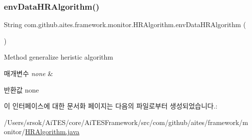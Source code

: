 \subsubsection{\texorpdfstring{env\+Data\+H\+R\+Algorithm()}{envDataHRAlgorithm()}}
{\footnotesize\ttfamily String com.\+github.\+aites.\+framework.\+monitor.\+H\+R\+Algorithm.\+env\+Data\+H\+R\+Algorithm (\begin{DoxyParamCaption}{ }\end{DoxyParamCaption})}



Method generalize heristic algorithm 


\begin{DoxyParams}{매개변수}
{\em none} & \\
\hline
\end{DoxyParams}
\begin{DoxyReturn}{반환값}
none 
\end{DoxyReturn}


이 인터페이스에 대한 문서화 페이지는 다음의 파일로부터 생성되었습니다.\+:\begin{DoxyCompactItemize}
\item 
/\+Users/srsok/\+Ai\+T\+E\+S/core/\+Ai\+T\+E\+S\+Framework/src/com/github/aites/framework/monitor/\mbox{\hyperlink{_h_r_algorithm_8java}{H\+R\+Algorithm.\+java}}\end{DoxyCompactItemize}
